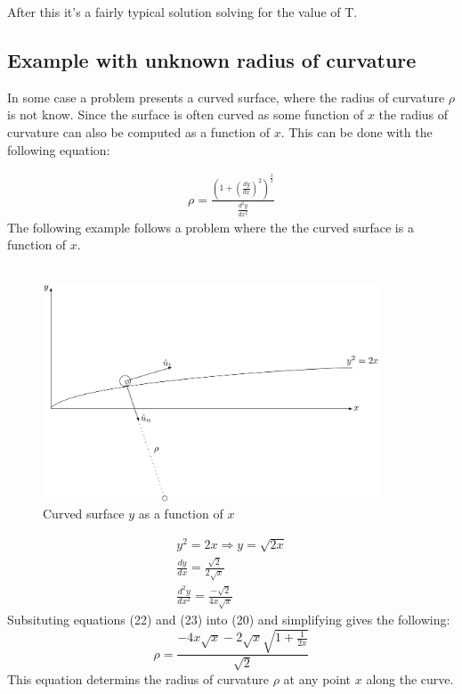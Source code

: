 \documentclass[11pt, a4paper]{article}
\begin{document}
After this it's a fairly typical solution solving for the value of T.

\subsection{Example with unknown radius of curvature}
In some case a problem presents a curved surface, where the radius of curvature 
$\rho$ is not know. Since the surface is often curved as some function of $x$ the
radius of curvature can also be computed as a function of $x$. This can be done with
the following equation:

\begin{gather}
    \rho = \frac{(1+(\frac{dy}{dx})^2)^\frac{3}{2}}{\frac{d^2y}{dx^2}}
\end{gather}
The following example follows a problem where the the curved surface is a function of $x$.\\
\\
\begin{figure}[h]
    \centerline{\includegraphics[width=10cm]{images/Final_example.png}}    
    \caption{Curved surface $y$ as a function of $x$}
\end{figure}

\begin{gather}
    y^2 = 2x \Rightarrow y = \sqrt{2x}\\
    \frac{dy}{dx} = \frac{\sqrt{2}}{2\sqrt{x}}\\
    \frac{d^2y}{dx^2} = \frac{-\sqrt{2}}{4x\sqrt{x}}
\end{gather}
Subsituting equations (22) and (23) into (20) and simplifying gives the following:
\begin{equation}
    \rho = \frac{-4x\sqrt{x}-2\sqrt{x}\sqrt{1+\frac{1}{2x}}}{\sqrt{2}}    
\end{equation}
This equation determins the radius of curvature $\rho$ at any point $x$ along the curve.
\end{document}
